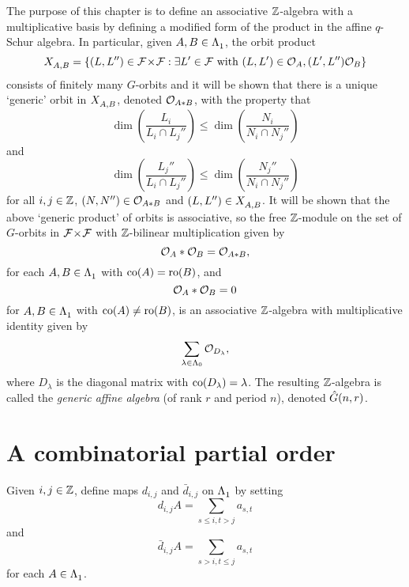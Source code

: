 \documentclass[a4paper, 11pt]{report}
\begin{document}
The purpose of this chapter is to define an associative $\mathbb{Z}$-algebra with a multiplicative basis by defining a modified form of the product in the affine $q$-Schur algebra. In particular, given $A,B\in\Lambda_1^{}$, the orbit product
\begin{equation*}
X_{A,B}^{} = \{(L,L'')\in{\mathcal{F}\!\times\!\mathcal{F}}: \exists L'\in\mathcal{F}\text{ with } (L,L')\in\mathcal{O}_{A}, (L',L'')\mathcal{O}_{B}\}
\end{equation*}
consists of finitely many $G$-orbits and it will be shown that there is a unique `generic' orbit in $X_{A,B}^{}$, denoted $\mathcal{O}_{A\ast B}$, with the property that
\begin{equation*}
\dim\left(\frac{L_i}{L_i\cap L_j''}\right)\le\dim\left(\frac{N_i}{N_i\cap N_j''}\right)
\end{equation*}
and
\begin{equation*}
\dim\left(\frac{L_j''}{L_i\cap L_j''}\right)\le\dim\left(\frac{N_j''}{N_i\cap N_j''}\right)
\end{equation*}
for all $i,j\in\mathbb{Z}$, $(N,N'')\in\mathcal{O}_{A\ast B}$ and $(L,L'')\in X_{A,B}^{}$. It will be shown that the above `generic product' of orbits is associative, so the free $\mathbb{Z}$-module on the set of $G$-orbits in ${\mathcal{F}\!\times\!\mathcal{F}}$ with $\mathbb{Z}$-bilinear multiplication given by
\begin{equation*}
\mathcal{O}_{A}\ast\mathcal{O}_{B}=\mathcal{O}_{A\ast B},
\end{equation*}
for each $A,B\in\Lambda_1^{}$ with $\operatorname{co}(A)=\operatorname{ro}(B)$, and
\begin{equation*}
\mathcal{O}_{A}\ast\mathcal{O}_{B} = 0
\end{equation*}
for $A,B\in\Lambda_1^{}$ with $\operatorname{co}(A)\neq\operatorname{ro}(B)$, is an associative $\mathbb{Z}$-algebra with multiplicative identity given by
\begin{equation*}
\sum_{\lambda\in{\Lambda_0}} \mathcal{O}_{D_\lambda},
\end{equation*}
where $D_\lambda$ is the diagonal matrix with $\operatorname{co}(D_\lambda)=\lambda$. The resulting $\mathbb{Z}$-algebra is called the \emph{generic affine algebra} (of rank $r$ and period $n$), denoted $\hat{G}(n,r)$.

\section{A combinatorial partial order}

Given $i,j\in\mathbb{Z}$, define maps $d_{i,j}$ and $\bar{d}_{i,j}$ on $\Lambda_1^{}$ by setting
\begin{equation*}
d_{i,j}{A} = \sum_{s\le i,t>j} a_{s,t}
\end{equation*}
and
\begin{equation*}
\bar{d}_{i,j}{A} = \sum_{s>i, t\le j} a_{s,t}
\end{equation*}
for each $A\in\Lambda_1^{}$.
\end{document}
